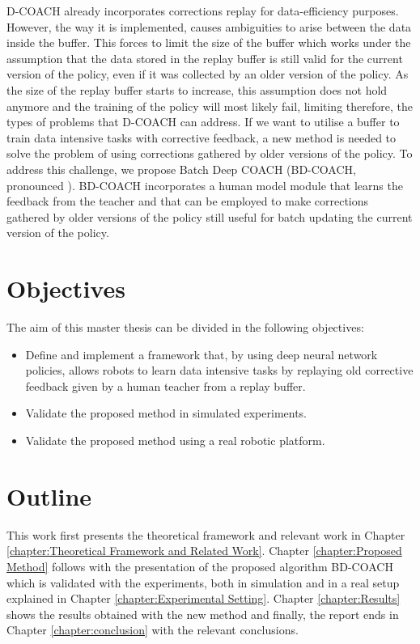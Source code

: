 D-COACH already incorporates corrections replay for data-efficiency purposes. However, the way it is implemented, causes ambiguities to arise between the data inside the buffer. This forces to limit the size of the buffer which works under the assumption that the data stored in the replay buffer is still valid for the current version of the policy, even if it was collected by an older version of the policy. As the size of the replay buffer starts to increase, this assumption does not hold anymore and the training of the policy will most likely fail, limiting therefore, the types of problems that D-COACH can address. If we want to utilise a buffer to train data intensive tasks with corrective feedback, a new method is needed to solve the problem of using corrections gathered by older versions of the policy. To address this challenge, we propose Batch Deep COACH (BD-COACH, pronounced ). BD-COACH incorporates a human model module that learns the feedback from the teacher and that can be employed to make corrections gathered by older versions of the policy still useful for batch updating the current version of the policy.





\section{Objectives}
\label{section:aim}


The aim of this master thesis can be divided in the following objectives:


\begin{itemize}
  \item Define and implement a framework that, by using deep neural network policies, allows robots to learn data intensive tasks by replaying old corrective feedback given by a human teacher from a replay buffer.
 

  \item Validate the proposed method in simulated experiments.
 \item Validate the proposed method using a real robotic platform.
\end{itemize}




\section{Outline}
\label{section:outline}




This work first presents the theoretical framework and relevant work in Chapter \ref{chapter:Theoretical Framework and Related Work}. Chapter \ref{chapter:Proposed Method} follows with the presentation of the proposed algorithm BD-COACH which is validated with the experiments, both in simulation and in a real setup explained in Chapter \ref{chapter:Experimental Setting}. Chapter \ref{chapter:Results} shows the results obtained with the new method and finally, the report ends in Chapter \ref{chapter:conclusion} with the relevant conclusions.

